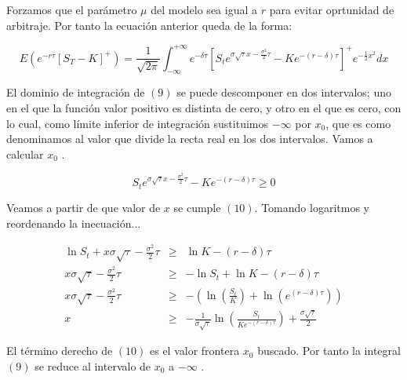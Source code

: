 \documentclass[12pt]{article}
\begin{document}
Forzamos que el par\'{a}metro $\mu$ del modelo sea igual a $r$ para evitar oprtunidad de arbitraje. Por tanto la ecuaci\'{o}n anterior queda
de la forma:
\newline

\begin{equation}
	E\left( e^{-r\tau} \left[ S_{T} - K \right] ^{+} \right) = \frac{1}{\sqrt{2\pi}}\int_{-\infty}^{+\infty}e^{-\delta\tau}
	\left[S_{t}e^{\sigma\sqrt{\tau}x-\frac{\sigma^{2}}{2}\tau}-Ke^{-(r-\delta)\tau}\right]^{+}e^{-
	\frac{1}{2}x^{2}}dx
\end{equation}
\newline

El dominio de integraci\'{o}n de $(9)$ se puede descomponer en dos intervalos; uno en el que la funci\'{o}n valor positivo es distinta de
cero, y otro en el que es cero, con lo cual, como l\'{i}mite inferior de integraci\'{o}n sustituimos $-\infty$ por $x_{0}$, 
que es como denominamos al valor que divide la recta real en los dos intervalos. Vamos a calcular $x_{0}$ .
\newline

\begin{equation}
	S_{t}e^{\sigma\sqrt{\tau}x-\frac{\sigma^{2}}{2}\tau}-Ke^{-\left(r-\delta\right)\tau} \geq 0
\end{equation}
\newline

Veamos a partir de que valor de $x$ se cumple $(10)$. Tomando logaritmos y reordenando la inecuaci\'{o}n...
\newline

\begin{eqnarray}
	\ln S_{t} +x\sigma\sqrt{\tau} - \frac{\sigma^{2}}{2}\tau & \geq & \ln K - \left(r - \delta \right) \tau \nonumber \\
	x\sigma\sqrt{\tau} - \frac{\sigma^{2}}{2}\tau & \geq & -\ln S_{t} + \ln K - \left( r - \delta \right) \tau \nonumber \\
	x\sigma\sqrt{\tau} - \frac{\sigma^{2}}{2}\tau & \geq & -\left(\ln\left(\frac{S_{t}}{K}\right) + \ln\left(e^{\left(r-
	\delta\right)\tau}\right)\right) \nonumber \\
	x & \geq & - \frac{1}{\sigma\sqrt{\tau}} \ln\left(\frac{S_{t}}{Ke^{-\left(r-\delta\right)\tau}}\right) + 
	\frac{\sigma\sqrt{\tau}}{2}
\end{eqnarray}
\newline

El t\'{e}rmino derecho de $(10)$ es el valor frontera $x_{0}$ buscado. Por tanto la integral $(9)$ se reduce al intervalo de $x_{0}$ a
$-\infty$ .
\newline
\end{document}
